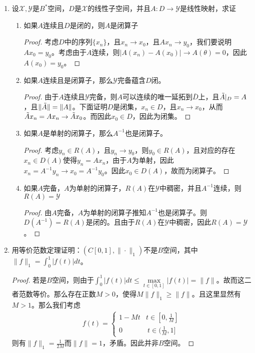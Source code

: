 \begin{enumerate}[leftmargin=2cm, label=\arabic*]
    \item 设$\mathscr{X},\mathscr{Y}$是$B^*$空间，$D$是$\mathscr{X}$的线性子空间，并且$A:D\to\mathscr{Y}$是线性映射，求证
    \begin{enumerate}[leftmargin=1cm, label=(\arabic*)]
        \item 如果$A$连续且$D$是闭的，则$A$是闭算子
        \begin{proof}
            考虑$D$中的序列$\{x_n\}$，且$x_n\to x_0$，且$Ax_n \to y_0$，我们要说明$Ax_0 = y_0$。考虑由于$A$连续，则$|A(x_n) - A(x_0)| \to A(\theta) = 0$，因此$A(x_0) = y_0$。
        \end{proof}

        \item 如果$A$连续且是闭算子，那么$\mathscr{Y}$完备蕴含$D$闭。
        \begin{proof}
            由于$A$连续且$\mathscr{Y}$完备，则$A$可以连续的唯一延拓到$\bar{D}$上，且$\Tilde{A}|_D = A$，且$\|\Tilde{A}\| = \|A\|$。下面证明$D$是闭集，$x_n\in D$，且$x_n\to x_0$，从而$\Tilde{A}x_n = Ax_n \to \Tilde{A}x_0$。而因此$x_0\in D$，因此为闭集。
        \end{proof}

        \item 如果$A$是单射的闭算子，那么$A^{-1}$也是闭算子。
        \begin{proof}
            考虑$y_n\in R(A)$，且$y_n \to y_0$，则$y_0\in R(A)$，且对应的存在$x_n\in D(A)$使得$y_n = Ax_n$，由于$A$为单射，因此$x_n = A^{-1}y_n \to x_0 = A^{-1}y_0$。因此$x_0\in D(A)$，故而为闭算子。
        \end{proof}

        \item 如果$A$完备，$A$为单射的闭算子，$R(A)$在$\mathscr{Y}$中稠密，并且$A^{-1}$连续，则$R(A) = \mathscr{Y}$
        \begin{proof}
            由$A$完备，$A$为单射的闭算子推知$A^{-1}$也是闭算子。则$D(A^{-1}) = R(A)$是闭的。且由于$R(A)$在$\mathscr{Y}$中稠密，因此$R(A) = \mathscr{Y}$。
        \end{proof}
        
    \end{enumerate}

    \item 用等价范数定理证明：$(C[0,1],\|\cdot\|_1)$不是$B$空间，其中$\|f\|_1 = \int_0^1 |f(t)|dt$。
    \begin{proof}
        若是$B$空间，则由于$\int_0^1|f(t)|dt\leqslant \max\limits_{t\in[0,1]} |f(t)| = \|f\|$。故而这二者范数等价。那么存在正数$M>0$，使得$M\|f\|_1\geqslant \|f\|$。且这里显然有$M>1$。那么我们考虑
        \begin{align*}
            f(t) = \left\lbrace\begin{array}{ll}
                1 - M t & t\in[0,\frac{1}{M}] \\
                0  & \ t\in(\frac{1}{M},1]
            \end{array} \right.
       \end{align*}
        则有$\|f\|_1 = \frac{1}{2M}$而$\|f\| = 1$，矛盾。因此并非$B$空间。
    \end{proof}


\end{enumerate}
